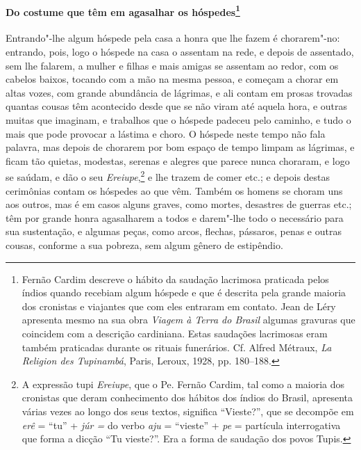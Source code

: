 \begin{linenumbers}
\paragraph[Do costume que têm em agasalhar os hóspedes]{Do costume que têm em 
agasalhar os hóspedes\protect\footnote{ Fernão Cardim descreve o hábito da
saudação lacrimosa praticada pelos índios quando recebiam algum
hóspede e que é descrita pela grande maioria dos cronistas e viajantes
que com eles entraram em contato. Jean de Léry apresenta mesmo na
sua obra \textit{Viagem à Terra do Brasil} algumas gravuras que
coincidem com a descrição cardiniana. Estas saudações lacrimosas eram
também praticadas durante os rituais funerários. Cf. Alfred Métraux,
\textit{La Religion des Tupinambá}, Paris, Leroux, 1928, pp. 180--188.}} \quad
Entrando"-lhe algum hóspede pela casa a honra que lhe fazem é
chorarem"-no: entrando, pois, logo o hóspede na casa o assentam na rede,
e depois de assentado, sem lhe falarem, a mulher e filhas e mais
amigas se assentam ao redor, com os cabelos baixos, tocando com a mão
na mesma pessoa, e começam a chorar em altas vozes, com grande
abundância de lágrimas, e ali contam em prosas trovadas quantas cousas
têm acontecido desde que se não viram até aquela hora, e outras muitas
que imaginam, e trabalhos que o hóspede padeceu pelo caminho, e tudo o
mais que pode provocar a lástima e choro. O hóspede neste tempo não
fala palavra, mas depois de chorarem por bom espaço de tempo limpam as
lágrimas, e ficam tão quietas, modestas, serenas e alegres que parece
nunca choraram, e logo se saúdam, e dão o seu 
\textit{Ereiupe},\footnote{ A expressão tupi \textit{Ereiupe}, que o Pe. Fernão
Cardim, tal como a maioria dos cronistas que deram conhecimento dos
hábitos dos índios do Brasil, apresenta várias vezes ao longo dos seus
textos, significa ``Vieste?'', que se decompõe em \textit{erê} = ``tu'' +
\textit{júr =} do verbo \textit{aju} = ``vieste'' + \textit{pe} =
partícula interrogativa que forma a dicção ``Tu vieste?''. Era a forma
de saudação dos povos Tupis.} e lhe trazem de comer etc.; e
depois destas cerimônias contam os hóspedes ao que vêm. Também os
homens se choram uns aos outros, mas é em casos alguns graves, como
mortes, desastres de guerras etc.; têm por grande honra agasalharem a
todos e darem"-lhe todo o necessário para sua sustentação, e algumas
peças, como arcos, flechas, pássaros, penas e outras cousas, conforme a
sua pobreza, sem algum gênero de estipêndio.


\end{linenumbers}
